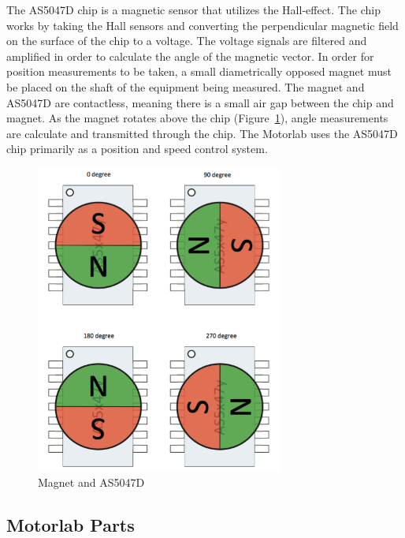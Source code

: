 The AS5047D chip is a magnetic sensor that utilizes the Hall-effect. The chip works by taking the Hall sensors and converting the perpendicular magnetic field on the surface of the chip to a voltage. The voltage signals are filtered and amplified in order to calculate the angle of the magnetic vector. In order for position measurements to be taken, a small diametrically opposed magnet must be placed on the shaft of the equipment being measured. The magnet and AS5047D are contactless, meaning there is a small air gap between the chip and magnet. As the magnet rotates above the chip (Figure~\ref{magnet_rotation}), angle measurements are calculate and transmitted through the chip. The Motorlab uses the AS5047D chip primarily as a position and speed control system. 

\begin{figure}[htb]%
\begin{center}
    \includegraphics[height=4in]{figures/magnetic_field.png}

    \caption[Magnet and AS5047D]{Magnet and AS5047D}

    \label{magnet_rotation}
\end{center}
\end{figure}

\subsection{Motorlab Parts}
\label{makereference2.1.2} 

